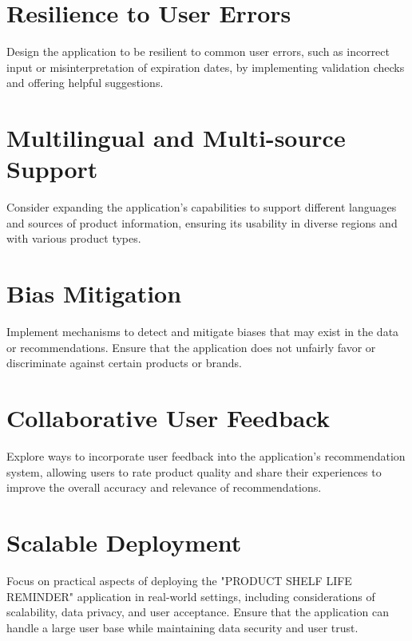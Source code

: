 \section{ Resilience to User Errors}
Design the application to be resilient to common user errors, such as incorrect input or misinterpretation of expiration dates, by implementing validation checks and offering helpful suggestions.

\section{ Multilingual and Multi-source Support}
Consider expanding the application's capabilities to support different languages and sources of product information, ensuring its usability in diverse regions and with various product types.

\section{ Bias Mitigation}
Implement mechanisms to detect and mitigate biases that may exist in the data or recommendations. Ensure that the application does not unfairly favor or discriminate against certain products or brands.

\section{ Collaborative User Feedback}
Explore ways to incorporate user feedback into the application's recommendation system, allowing users to rate product quality and share their experiences to improve the overall accuracy and relevance of recommendations.

\section{ Scalable Deployment}
Focus on practical aspects of deploying the "PRODUCT SHELF LIFE REMINDER" application in real-world settings, including considerations of scalability, data privacy, and user acceptance. Ensure that the application can handle a large user base while maintaining data security and user trust.

